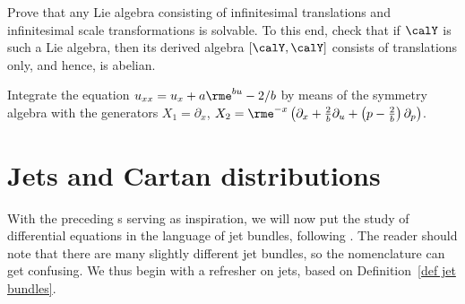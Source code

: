 \begin{xca}
    Prove that any Lie algebra consisting of infinitesimal translations and infinitesimal scale transformations is solvable. To this end, check that if $\calY$ is such a Lie algebra, then its derived algebra $[\calY,\calY]$ consists of translations only, and hence, is abelian.
\end{xca}





\begin{xca}
    Integrate the equation $u_{xx}=u_x+a\rme^{bu}-2/b$ by means of the symmetry algebra with the generators $X_1=\partial_x$, $X_2=\rme^{-x}\left(\partial_x+\frac{2}{b}\partial_u+\left(p-\frac{2}{b}\right)\partial_p\right)$.
\end{xca}







\section{Jets and Cartan distributions}\label{sec: jets and cartan distr}


With the preceding \sect s serving as inspiration, we will now put the study of differential equations in the language of jet bundles, following \cite[\S3.2]{Kras}. The reader should note that there are many slightly different jet bundles, so the nomenclature can get confusing. We thus begin with a refresher on jets, based on Definition~\ref{def jet bundles}.

